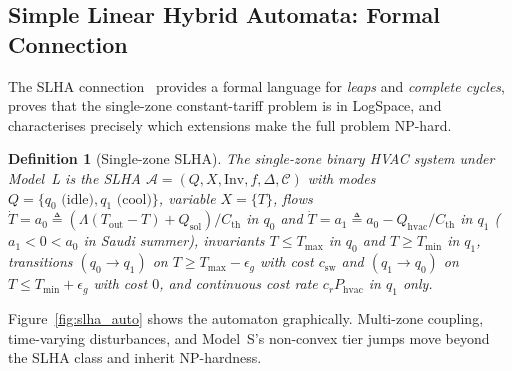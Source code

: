 \documentclass[12pt,a4paper]{article}
\let\oldsubsection\subsection
\renewcommand{\subsection}[1]{\FloatBarrier\oldsubsection{#1}}
\newtheorem{definition}{Definition}
\newcommand{\Tmin}{T_{\min}}
\newcommand{\Tmax}{T_{\max}}
\newcommand{\Tout}{T_{\mathrm{out}}}
\newcommand{\Cth}{C_{\mathrm{th}}}
\newcommand{\Qhvac}{Q_{\mathrm{hvac}}}
\newcommand{\csw}{c_{\mathrm{sw}}}
\newcommand{\Phvac}{P_{\mathrm{hvac}}}
\begin{document}
\subsection{Simple Linear Hybrid Automata: Formal Connection}
\label{subsec:slha}

The SLHA connection~\cite{Mousa2018} provides a formal language for
\emph{leaps} and \emph{complete cycles}, proves that the single-zone
constant-tariff problem is in LogSpace, and characterises precisely which
extensions make the full problem NP-hard.

\begin{definition}[Single-zone SLHA]
\label{def:slha}
The single-zone binary HVAC system under Model~L is the SLHA
$\mathcal{A}=(Q,X,\mathrm{Inv},f,\Delta,\mathcal{C})$ with
modes $Q=\{q_0\text{ (idle)},q_1\text{ (cool)}\}$, variable $X=\{T\}$,
flows $\dot{T}{=}a_0\triangleq(\Lambda(\Tout-T)+Q_{\mathrm{sol}})/\Cth$
in $q_0$ and $\dot{T}{=}a_1\triangleq a_0-\Qhvac/\Cth$ in $q_1$
($a_1<0<a_0$ in Saudi summer),
invariants $T\!\le\!\Tmax$ in $q_0$ and $T\!\ge\!\Tmin$ in $q_1$,
transitions $(q_0\!\to\!q_1)$ on $T\!\ge\!\Tmax\!-\!\epsilon_g$ with
cost $\csw$ and $(q_1\!\to\!q_0)$ on $T\!\le\!\Tmin\!+\!\epsilon_g$
with cost $0$, and continuous cost rate $c_r\Phvac$ in $q_1$ only.
\end{definition}

Figure~\ref{fig:slha_auto} shows the automaton graphically.
Multi-zone coupling, time-varying disturbances, and Model~S's
non-convex tier jumps move beyond the SLHA class and inherit NP-hardness.
\end{document}
